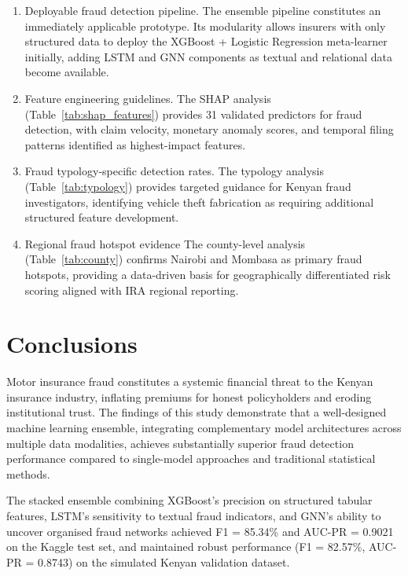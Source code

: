 \documentclass[12pt,a4paper,oneside]{report}
\numberwithin{equation}{chapter}
\begin{document}
\begin{enumerate}[leftmargin=*, label=\textbf{\arabic*.}]

  \item Deployable fraud detection pipeline.
  The ensemble pipeline constitutes an immediately applicable prototype. Its modularity allows
  insurers with only structured data to deploy the XGBoost + Logistic Regression meta-learner
  initially, adding LSTM and GNN components as textual and relational data become available.

  \item Feature engineering guidelines.
  The SHAP analysis (Table~\ref{tab:shap_features}) provides 31 validated predictors for fraud
  detection, with claim velocity, monetary anomaly scores, and temporal filing patterns identified
  as highest-impact features.

  \item Fraud typology-specific detection rates.
  The typology analysis (Table~\ref{tab:typology}) provides targeted guidance for Kenyan fraud
  investigators, identifying vehicle theft fabrication as requiring additional structured feature
  development.

  \item Regional fraud hotspot evidence
  The county-level analysis (Table~\ref{tab:county}) confirms Nairobi and Mombasa as primary
  fraud hotspots, providing a data-driven basis for geographically differentiated risk scoring
  aligned with IRA regional reporting.

\end{enumerate}

\section{Conclusions}

Motor insurance fraud constitutes a systemic financial threat to the Kenyan insurance industry,
inflating premiums for honest policyholders and eroding institutional trust. The findings of this
study demonstrate that a well-designed machine learning ensemble, integrating complementary model
architectures across multiple data modalities, achieves substantially superior fraud detection
performance compared to single-model approaches and traditional statistical methods.

The stacked ensemble combining XGBoost's precision on structured tabular features, LSTM's
sensitivity to textual fraud indicators, and GNN's ability to uncover organised fraud networks
achieved F1 = 85.34\% and AUC-PR = 0.9021 on the Kaggle test set, and maintained robust
performance (F1 = 82.57\%, AUC-PR = 0.8743) on the simulated Kenyan validation dataset.
\end{document}
